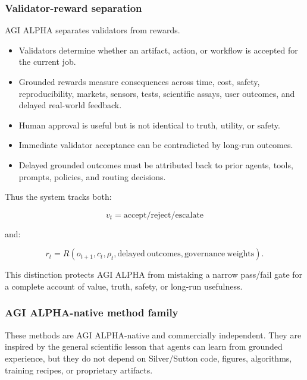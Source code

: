 \documentclass[11pt]{article}
\providecommand{\tightlist}{\setlength{\itemsep}{0pt}\setlength{\parskip}{0pt}}
\begin{document}
\subsubsection{Validator-reward
separation}\label{validator-reward-separation}

AGI ALPHA separates validators from rewards.

\begin{itemize}
\tightlist
\item
  Validators determine whether an artifact, action, or workflow is
  accepted for the current job.
\item
  Grounded rewards measure consequences across time, cost, safety,
  reproducibility, markets, sensors, tests, scientific assays, user
  outcomes, and delayed real-world feedback.
\item
  Human approval is useful but is not identical to truth, utility, or
  safety.
\item
  Immediate validator acceptance can be contradicted by long-run
  outcomes.
\item
  Delayed grounded outcomes must be attributed back to prior agents,
  tools, prompts, policies, and routing decisions.
\end{itemize}

Thus the system tracks both:

\[
v_t=\mathrm{accept/reject/escalate}
\]

and:

\[
r_t=R(o_{t+1},c_t,\rho_t,\mathrm{delayed\ outcomes},\mathrm{governance\ weights}).
\]

This distinction protects AGI ALPHA from mistaking a narrow pass/fail
gate for a complete account of value, truth, safety, or long-run
usefulness.

\subsubsection{AGI ALPHA-native method
family}\label{agi-alpha-native-method-family}

These methods are AGI ALPHA-native and commercially independent. They
are inspired by the general scientific lesson that agents can learn from
grounded experience, but they do not depend on Silver/Sutton code,
figures, algorithms, training recipes, or proprietary artifacts.
\end{document}

